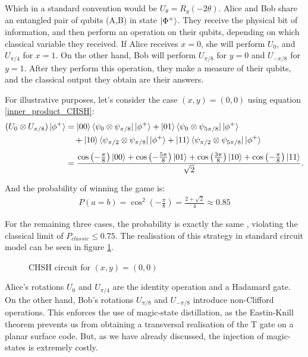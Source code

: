 \documentclass[12pt, twoside, openany]{book}
\begin{document}
Which in a standard convention would be $U_\theta = R_y(-2 \theta)$. Alice and Bob share an entangled pair of qubits (A,B) in state $\ket{\Phi^+}$. They receive the physical bit of information, and then perform an operation on their qubits, depending on which classical variable they received. If Alice receives $x=0$, she will perform $U_0$, and $U_{\pi/4}$ for $x=1$. On the other hand, Bob will perform $U_{\pi/8}$ for $y=0$ and $U_{-\pi/8}$ for $y=1$. After they perform this operation, they make a measure of their qubits, and the classical output they obtain are their answers. 

For illustrative purposes, let's consider the case $(x,y)=(0,0)$ using equation \ref{inner_product_CHSH}:
\begin{align*}
(U_0 \otimes U_{\pi/8}) \ket{\phi^+} &= \ket{00} \bra{\psi_0 \otimes \psi_{\pi/8}} \ket{\phi^+} + \ket{01} \bra{\psi_0 \otimes \psi_{5\pi/8}} \ket{\phi^+} \\
&\quad + \ket{10} \bra{\psi_{\pi/2} \otimes \psi_{\pi/8}} \ket{\phi^+} + \ket{11} \bra{\psi_{\pi/2} \otimes \psi_{5\pi/8}} \ket{\phi^+} \\[1ex]
&= \frac{\cos\left(-\frac{\pi}{8}\right)\ket{00} + \cos\left(-\frac{5\pi}{8}\right)\ket{01} + \cos\left(\frac{3\pi}{8}\right)\ket{10} + \cos\left(-\frac{\pi}{8}\right)\ket{11}}{\sqrt{2}}.
\end{align*}

And the probability of winning the game is:
\begin{align*}
    P(a=b)= \cos^2(-\frac{\pi}{8}) = \frac{2 + \sqrt{2}}{4} \approx 0.85
\end{align*}

For the remaining three cases, the probability is exactly the same \cite{watrous2025understandingquantuminformationcomputation}, violating the classical limit of $P_{classic} \leq 0.75$. The realisation of this strategy in standard circuit model can be seen in figure \ref{fig:CHSH_circuit}.

\begin{figure}[ht]
    \centering
    
    \caption{CHSH circuit for $(x,y) = (0,0)$}
    \label{fig:CHSH_circuit}
\end{figure}

Alice's rotations $U_0$ and $U_{\pi /4}$ are the identity operation and a Hadamard gate. On the other hand, Bob's rotations $U_{\pi/8}$ and $U_{-\pi/8}$ introduce non-Clifford operations. This enforces the use of magic-state distillation, as the Eastin-Knill theorem prevents us from obtaining a transversal realisation of the T gate on a planar surface code. But, as we have already discussed, the injection of magic-states is extremely costly.
\end{document}
